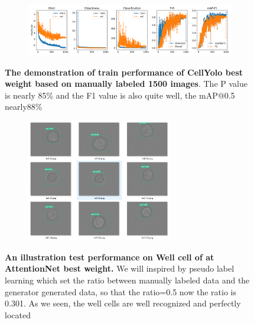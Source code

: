 \begin{figure}[h]
	\begin{center}
		\begin{subfigure}[b]{\textwidth}
		    \centering
			\includegraphics[width=1\textwidth]{thesis-template-master/images/cellyolo best weight based on manually labeled 1500 images.png}
			\label{fig:cellnet}
		\end{subfigure}
	\end{center}
	\caption{\textbf{The demonstration of train performance of CellYolo best weight based on manually labeled 1500 images}. The P value is nearly 85\% and the F1 value is also quite well, the mAP@0.5 nearly88\%}
\end{figure}

\begin{figure}[t]
	\begin{center}
		\begin{subfigure}[b]{\textwidth}
		    \centering
			\includegraphics[width=0.7\textwidth]{thesis-template-master/images/An illustration test performance of CellYolo best weight.png}
			\label{fig:cellnet}
		\end{subfigure}
	\end{center}
	\caption{\textbf{An illustration test performance on Well cell of at AttentionNet best weight.} We will inspired by pseudo label learning which set the ratio between manually labeled data and the generator generated data, so that the ratio=0.5 now  the ratio is 0.301. As we seen, the well cells are well recognized and perfectly located}
\end{figure}



